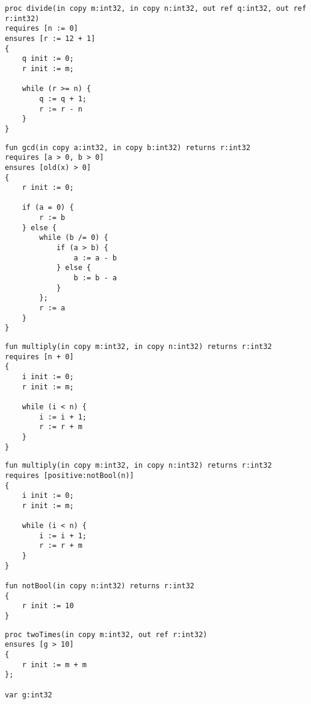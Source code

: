 \begin{lstlisting}[caption=Wert einer Variable in der pre-/postcondition ändern]
proc divide(in copy m:int32, in copy n:int32, out ref q:int32, out ref r:int32)
requires [n := 0]
ensures [r := 12 + 1]
{
    q init := 0;
    r init := m;

    while (r >= n) {
        q := q + 1;
        r := r - n
    }
}
\end{lstlisting}

\begin{lstlisting}[caption=Zugriff auf nicht vorhandene Variable in der old Funktion]
fun gcd(in copy a:int32, in copy b:int32) returns r:int32
requires [a > 0, b > 0]
ensures [old(x) > 0]
{
    r init := 0;
    
    if (a = 0) {
        r := b
    } else {
        while (b /= 0) {
            if (a > b) {
                a := a - b
            } else {
                b := b - a
            }
        };
        r := a
    }
}
\end{lstlisting}

\begin{lstlisting}[caption=Eine nicht Boolsche Expression in der Condition List]
fun multiply(in copy m:int32, in copy n:int32) returns r:int32
requires [n + 0]
{
    i init := 0;
    r init := m;

    while (i < n) {
        i := i + 1;
        r := r + m
    }
}
\end{lstlisting}

\begin{lstlisting}[caption=Eine Funktion in der Condition List welche keinen boolschen Wert zurückliefert]
fun multiply(in copy m:int32, in copy n:int32) returns r:int32
requires [positive:notBool(n)]
{
    i init := 0;
    r init := m;

    while (i < n) {
        i := i + 1;
        r := r + m
    }
}

fun notBool(in copy n:int32) returns r:int32
{
    r init := 10
}
\end{lstlisting}

\begin{lstlisting}[caption=Beispiel mit Zugriff auf globale Variable, welche nicht in der globalImportList importiert wurde]
proc twoTimes(in copy m:int32, out ref r:int32)
ensures [g > 10]
{
    r init := m + m
};

var g:int32

\end{lstlisting}
